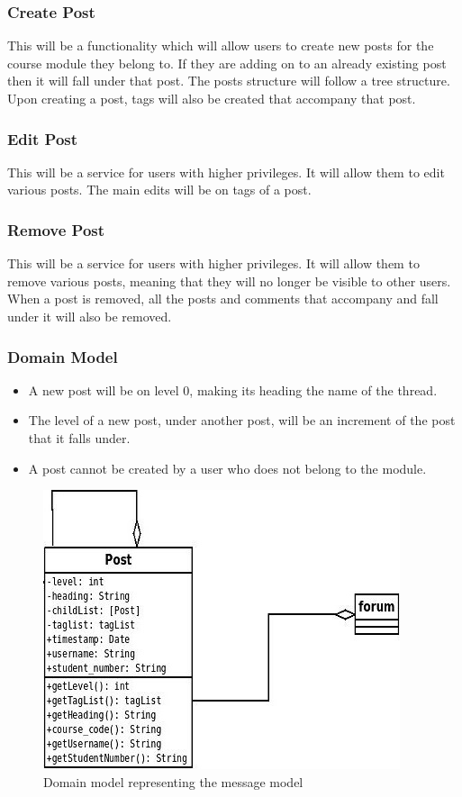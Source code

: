 \subsubsection*{Create Post}
\par{This will be a functionality which will allow users to create new posts for the course module they belong to. If they are adding on to an already existing post then it will fall under that post. The posts structure will follow a tree structure. Upon creating a post, tags will also be created that accompany that post.}
\subsubsection*{Edit Post}
\par{This will be a service for users with higher privileges. It will allow them to edit various posts. The main edits will be on tags of a post.}
\subsubsection*{Remove Post}
\par{This will be a service for users with higher privileges. It will allow them to remove various posts, meaning that they will no longer be visible to other users. When a post is removed, all the posts and comments that accompany and fall under it will also be removed.}
\subsubsection{Domain Model}
\begin{itemize}
\item A new post will be on level 0, making its heading the name of the thread.
\item The level of a new post, under another post, will be an increment of the post that it falls under.
\item A post cannot be created by a user who does not belong to the module. 
\end{itemize}
\begin{figure}[h!]
\includegraphics{Diagrams/posts_domain_model.jpeg}
\caption{Domain model representing the message model}
\label{fig:mesg}
\end{figure}